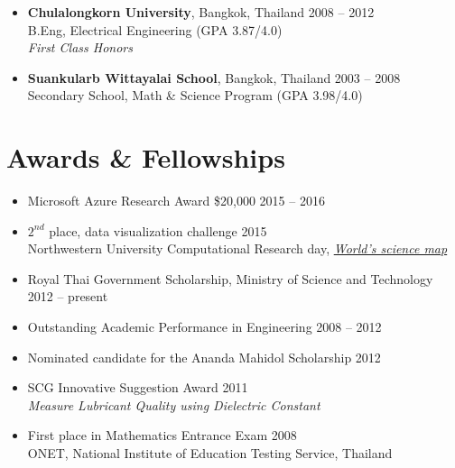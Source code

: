 \documentclass[margin,line]{res}
\begin{document}
\begin{resume}
\begin{itemize}[leftmargin=0cm, label={}]
\item {\bf Chulalongkorn University}, Bangkok, Thailand 			\hfill 2008 -- 2012 \\
B.Eng, Electrical Engineering								\hfill (GPA 3.87/4.0)\\
{\em First Class Honors}

\item {\bf Suankularb Wittayalai School}, Bangkok, Thailand 		\hfill 2003 -- 2008 \\
Secondary School, Math \& Science Program 					\hfill(GPA 3.98/4.0)

\end{itemize}


\section{\sc Awards \& Fellowships}

\begin{itemize}[leftmargin=0cm, label={}]
\itemsep0em

\item Microsoft Azure Research Award \$20,000 					\hfill 2015 -- 2016

\item $2^{nd}$ place, data visualization challenge					\hfill 2015\\
Northwestern University Computational Research day, {\em \href{http://map.scienceofscience.org}{World's science map}}

\item Royal Thai Government Scholarship, Ministry of Science and Technology \hfill 2012 -- present

\item Outstanding Academic Performance in Engineering			\hfill 2008 -- 2012

\item Nominated candidate for the Ananda Mahidol Scholarship 		\hfill 2012

\item SCG Innovative Suggestion Award							\hfill 2011\\
{\em Measure Lubricant Quality using Dielectric Constant}

\item First place in Mathematics Entrance Exam  					\hfill 2008\\
ONET, National Institute of Education Testing Service, Thailand


\end{itemize}
\end{resume}
\end{document}
